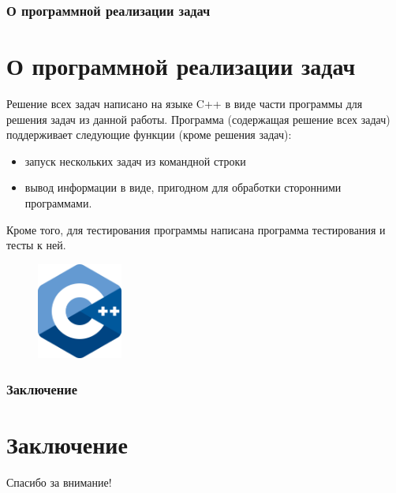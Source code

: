 \documentclass{beamer}
\newcommand\frametitleSpec[1]{%
\frametitle{#1}
\section{#1}%
}
\begin{document}
\begin{frame}
   \frametitleSpec{О программной реализации задач}
   Решение всех задач написано на языке C++ в виде части программы для решения задач из данной работы.
   Программа (содержащая решение всех задач) поддерживает следующие функции (кроме решения задач):
   \begin{itemize}
      \item запуск нескольких задач из командной строки
      \item вывод информации в виде, пригодном для обработки сторонними программами.
   \end{itemize}
   Кроме того, для тестирования программы написана программа тестирования и тесты к ней.
   \begin{figure}[h]
      \centering
      \includegraphics[width=0.25\textwidth]{images/cpp-logo.png}
   \end{figure}
\end{frame}
\begin{frame}
   \frametitleSpec{Заключение}

\end{frame}
\begin{frame}
   \begin{center}
      {\huge Спасибо за внимание!}
   \end{center}
\end{frame}
\end{document}
